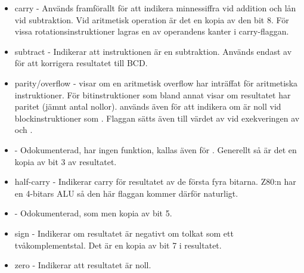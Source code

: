 \documentclass[main.tex]{subfiles}
\begin{document}
\begin{itemize}
    \item {} carry - Används framförallt för att indikera minnessiffra
        vid addition och lån vid subtraktion. Vid aritmetisk operation är det
        en kopia av den bit 8. För vissa rotationsinstruktioner lagras en av
        operandens kanter i carry-flaggan.
    \item {} subtract - Indikerar att instruktionen är en subtraktion.
        Används endast av  för att korrigera resultatet till BCD.
    \item {} parity/overflow -  visar om en aritmetisk overflow
        har inträffat för aritmetiska instruktioner. För bitinstruktioner som
        bland annat  visar  om resultatet har paritet (jämnt
        antal nollor).  används även för att indikera om  är
        noll vid blockinstruktioner som . Flaggan sätts även till
        värdet av  vid exekveringen av  och .
    \item {} - Odokumenterad, har ingen funktion, kallas även för
        . Generellt så är det en kopia av bit 3 av resultatet.
    \item {} half-carry - Indikerar carry för resultatet av de första
        fyra bitarna. Z80:n har en 4-bitars ALU så den här flaggan kommer
        därför naturligt.
    \item {} - Odokumenterad, som  men kopia av bit 5.
    \item {} sign - Indikerar om resultatet är negativt om tolkat som ett
        tvåkomplementstal. Det är en kopia av bit 7 i resultatet.
    \item {} zero - Indikerar att resultatet är noll.
\end{itemize}
\end{document}
